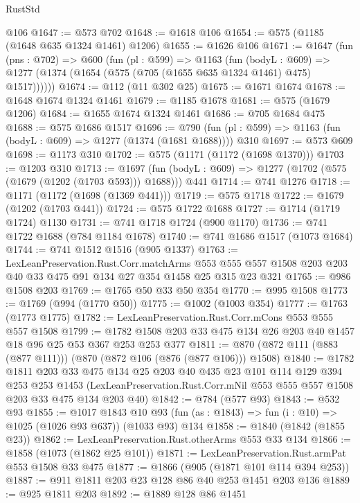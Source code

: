 \begin{lexlean}{RustStd}
\begin{coremodule}
    @106
@1647 := @573 @702
@1648 := @1618 @106
@1654 := @575 (@1185 (@1648 @635 @1324 @1461) @1206)
@1655 := @1626 @106
@1671 := @1647
    (fun (pns : @702) =>
    @600
      (fun (pl : @599) =>
      @1163
        (fun (bodyL : @609) =>
        @1277 (@1374 (@1654 (@575 (@705 (@1655 @635 @1324 @1461) @475) @1517))))))
@1674 := @112 (@11 @302 @25)
@1675 := @1671 @1674
@1678 := @1648 @1674 @1324 @1461
@1679 := @1185 @1678
@1681 := @575 (@1679 @1206)
@1684 := @1655 @1674 @1324 @1461
@1686 := @705 @1684 @475
@1688 := @575 @1686 @1517
@1696 := @790 (fun (pl : @599) => @1163 (fun (bodyL : @609) => @1277 (@1374 (@1681 @1688)))) @310
@1697 := @573 @609
@1698 := @1173 @310
@1702 := @575 (@1171 (@1172 (@1698 @1370)))
@1703 := @1203 @310
@1713 := @1697 (fun (bodyL : @609) => @1277 (@1702 (@575 (@1679 (@1202 (@1703 @593))) @1688))) @441
@1714 := @741 @1276
@1718 := @1171 (@1172 (@1698 (@1369 @441)))
@1719 := @575 @1718
@1722 := @1679 (@1202 (@1703 @441))
@1724 := @575 @1722 @1688
@1727 := @1714 (@1719 @1724) @1130
@1731 := @741 @1718 @1724 (@900 @1170)
@1736 := @741 @1722 @1688 (@784 @1184 @1678)
@1740 := @741 @1686 @1517 (@1073 @1684)
@1744 := @741 @1512 @1516 (@905 @1337)
@1763 := LexLeanPreservation.Rust.Corr.matchArms
    @553
    @555
    @557
    @1508
    @203
    @203
    @40
    @33
    @475
    @91
    @134
    @27
    @354
    @1458
    @25
    @315
    @23
    @321
@1765 := @986 @1508 @203
@1769 := @1765 @50 @33 @50 @354
@1770 := @995 @1508
@1773 := @1769 (@994 (@1770 @50))
@1775 := @1002 (@1003 @354)
@1777 := @1763 (@1773 @1775)
@1782 := LexLeanPreservation.Rust.Corr.mCons @553 @555 @557 @1508
@1799 := @1782 @1508 @203 @33 @475 @134 @26 @203 @40 @1457 @18 @96 @25 @53 @367 @253 @253 @377
@1811 := @870 (@872 @111 (@883 (@877 @111))) (@870 (@872 @106 (@876 (@877 @106))) @1508)
@1840 := @1782
    @1811
    @203
    @33
    @475
    @134
    @25
    @203
    @40
    @435
    @23
    @101
    @114
    @129
    @394
    @253
    @253
    @1453
    (LexLeanPreservation.Rust.Corr.mNil @553 @555 @557 @1508 @203 @33 @475 @134 @203 @40)
@1842 := @784 (@577 @93)
@1843 := @532 @93
@1855 := @1017
    @1843
    @10
    @93
    (fun (as : @1843) => fun (i : @10) => @1025 (@1026 @93 @637))
    (@1033 @93)
    @134
@1858 := @1840 (@1842 (@1855 @23))
@1862 := LexLeanPreservation.Rust.otherArms @553 @33 @134
@1866 := @1858 (@1073 (@1862 @25 @101))
@1871 := LexLeanPreservation.Rust.armPat @553 @1508 @33 @475
@1877 := @1866 (@905 (@1871 @101 @114 @394 @253))
@1887 := @911 @1811 @203 @23 @128 @86 @40 @253 @1451 @203 @136
@1889 := @925 @1811 @203
@1892 := @1889 @128 @86 @1451

\end{coremodule}
\end{lexlean}
